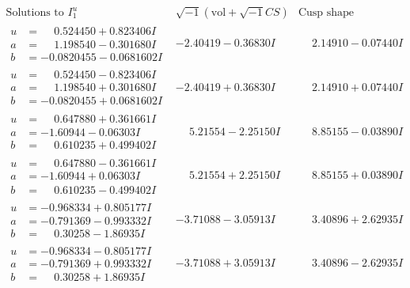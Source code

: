 \documentclass[1p]{elsarticle_modified}
\theoremstyle{definition}
\newcommand{\I}{\sqrt{-1}}
\begin{document}
$$\begin{array}{c|c|c}  
\text{Solutions to }I^u_{1}& \I (\text{vol} + \sqrt{-1}CS) & \text{Cusp shape}\\
 \hline 
\begin{aligned}
u &= \phantom{-}0.524450 + 0.823406 I \\
a &= \phantom{-}1.198540 - 0.301680 I \\
b &= -0.0820455 - 0.0681602 I\end{aligned}
 & -2.40419 - 0.36830 I & \phantom{-}2.14910 - 0.07440 I \\ \hline\begin{aligned}
u &= \phantom{-}0.524450 - 0.823406 I \\
a &= \phantom{-}1.198540 + 0.301680 I \\
b &= -0.0820455 + 0.0681602 I\end{aligned}
 & -2.40419 + 0.36830 I & \phantom{-}2.14910 + 0.07440 I \\ \hline\begin{aligned}
u &= \phantom{-}0.647880 + 0.361661 I \\
a &= -1.60944 - 0.06303 I \\
b &= \phantom{-}0.610235 + 0.499402 I\end{aligned}
 & \phantom{-}5.21554 - 2.25150 I & \phantom{-}8.85155 - 0.03890 I \\ \hline\begin{aligned}
u &= \phantom{-}0.647880 - 0.361661 I \\
a &= -1.60944 + 0.06303 I \\
b &= \phantom{-}0.610235 - 0.499402 I\end{aligned}
 & \phantom{-}5.21554 + 2.25150 I & \phantom{-}8.85155 + 0.03890 I \\ \hline\begin{aligned}
u &= -0.968334 + 0.805177 I \\
a &= -0.791369 - 0.993332 I \\
b &= \phantom{-}0.30258 - 1.86935 I\end{aligned}
 & -3.71088 - 3.05913 I & \phantom{-}3.40896 + 2.62935 I \\ \hline\begin{aligned}
u &= -0.968334 - 0.805177 I \\
a &= -0.791369 + 0.993332 I \\
b &= \phantom{-}0.30258 + 1.86935 I\end{aligned}
 & -3.71088 + 3.05913 I & \phantom{-}3.40896 - 2.62935 I \\ \hline\begin{aligned}

\end{aligned}
\end{array}$$
\end{document}
